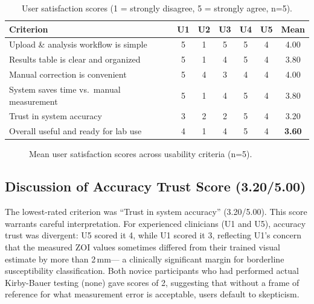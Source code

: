 \begin{table}[H]
  \centering
  \caption{User satisfaction scores (1 = strongly disagree, 5 = strongly agree, n=5).}
  \label{tab:usability}
  \begin{tabular}{lcccccc}
    \toprule
    \textbf{Criterion} & \textbf{U1} & \textbf{U2} & \textbf{U3} & \textbf{U4} & \textbf{U5} & \textbf{Mean} \\
    \midrule
    Upload \& analysis workflow is simple     & 5 & 1 & 5 & 5 & 4 & 4.00 \\
    Results table is clear and organized      & 5 & 1 & 4 & 5 & 4 & 3.80 \\
    Manual correction is convenient           & 5 & 4 & 3 & 4 & 4 & 4.00 \\
    System saves time vs.\ manual measurement & 5 & 1 & 4 & 5 & 4 & 3.80 \\
    Trust in system accuracy                  & 3 & 2 & 2 & 5 & 4 & 3.20 \\
    Overall useful and ready for lab use      & 4 & 1 & 4 & 5 & 4 & \textbf{3.60} \\
    \bottomrule
  \end{tabular}
\end{table}

\begin{figure}[H]
  \centering
  \caption{Mean user satisfaction scores across usability criteria (n=5).}
  \label{fig:usability_bar}
\end{figure}

\subsection{Discussion of Accuracy Trust Score (3.20/5.00)}

The lowest-rated criterion was ``Trust in system accuracy'' (3.20/5.00).
This score warrants careful interpretation.
For experienced clinicians (U1 and U5), accuracy trust was divergent: U5 scored it 4,
while U1 scored it 3, reflecting U1's concern that the measured ZOI values
sometimes differed from their trained visual estimate by more than 2\,mm---
a clinically significant margin for borderline susceptibility classification.
Both novice participants who had performed actual Kirby-Bauer testing (none) gave scores of 2,
suggesting that without a frame of reference for what measurement error is acceptable,
users default to skepticism.

